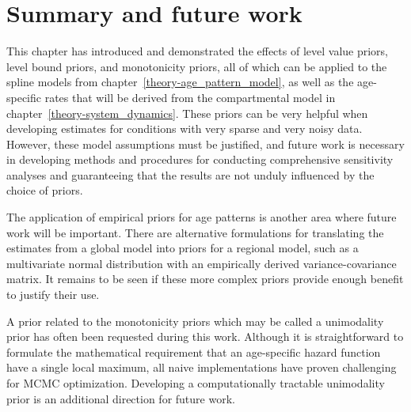 \section{Summary and future work}
This chapter has introduced and demonstrated the effects of level
value priors, level bound priors, and monotonicity priors, all of
which can be applied to the spline models from
chapter~\ref{theory-age_pattern_model}, as well as the age-specific
rates that will be derived from the compartmental model in
chapter~\ref{theory-system_dynamics}.  These priors can be very
helpful when developing estimates for conditions with very sparse and
very noisy data.  However, these model assumptions must be justified,
and future work is necessary in developing methods and procedures for
conducting comprehensive sensitivity analyses and guaranteeing that
the results are not unduly influenced by the choice of priors.

The application of empirical priors for age patterns is another area
where future work will be important.  There are alternative
formulations for translating the estimates from a global model into
priors for a regional model, such as a multivariate normal
distribution with an empirically derived variance-covariance matrix.
It remains to be seen if these more complex priors provide enough
benefit to justify their use.

A prior related to the monotonicity priors which may be called a unimodality
prior has often been requested during this work.
Although it is straightforward to formulate the mathematical
requirement that an age-specific hazard function have a single local
maximum, all naive implementations have proven challenging for MCMC
optimization. Developing a computationally tractable unimodality prior
is an additional direction for future work.
